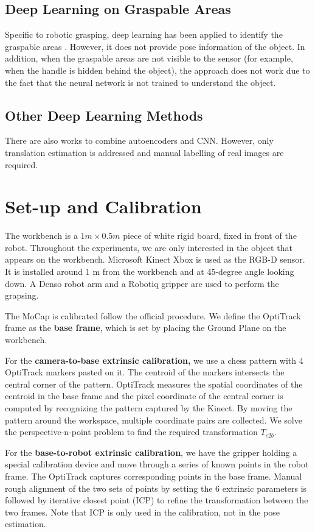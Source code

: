 \documentclass[conference]{IEEEtran}
\begin{document}
\subsection{Deep Learning on Graspable Areas}
Specific to robotic grasping, deep learning has been applied to identify the graspable areas \cite{saxena_2008_ijrr}. However, it does not provide pose information of the object. In addition, when the graspable areas are not visible to the sensor (for example, when the handle is hidden behind the object), the approach does not work due to the fact that the neural network is not trained to understand the object.

\subsection{Other Deep Learning Methods}
There are also works to combine autoencoders and CNN\cite{inoue_2018_icip}. However, only translation estimation is addressed and manual labelling of real images are required.


\section{Set-up and Calibration}
The workbench is a $1 m\times0.5 m$ piece of white rigid board, fixed in front of the robot. Throughout the experiments, we are only interested in the object that appears on the workbench. Microsoft Kinect Xbox is used as the RGB-D sensor. It is installed around 1 m from the workbench and at 45-degree angle looking down. A Denso robot arm and a Robotiq gripper are used to perform the grapsing.



The MoCap is calibrated follow the official procedure. We define the OptiTrack frame as the \textbf{base frame}, which is set by placing the Ground Plane on the workbench.

For the \textbf{camera-to-base extrinsic calibration,} we use a chess pattern with 4 OptiTrack markers pasted on it. The centroid of the markers intersects the central corner of the pattern. OptiTrack measures the spatial coordinates of the centroid in the base frame and the pixel coordinate of the central corner is computed by recognizing the pattern captured by the Kinect. By moving the pattern around the workspace, multiple coordinate pairs are collected. We solve the perspective-n-point problem to find the required transformation $T_{c2b}$.

For the \textbf{base-to-robot extrinsic calibration}, we have the gripper holding a special calibration device and move through a series of known points in the robot frame. The OptiTrack captures corresponding points in the base frame. Manual rough alignment of the two sets of points by setting the 6 extrinsic parameters is followed by iterative closest point (ICP) to refine the transformation between the two frames. Note that ICP is only used in the calibration, not in the pose estimation.
\end{document}
